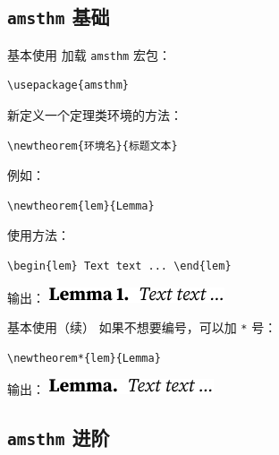 \documentclass[aspectratio=169,fontset=none]{ctexbeamer}
\newcommand{\pkg}[1]{\texttt{#1}}
\begin{document}
  \subsection{\texorpdfstring{\pkg{amsthm}}{amsthm} 基础}
  \begin{frame}[fragile]{基本使用}
    加载 \pkg{amsthm} 宏包：
    \begin{verbatim}
\usepackage{amsthm}
    \end{verbatim}
    新定义一个定理类环境的方法：
    \begin{verbatim}
\newtheorem{环境名}{标题文本}
    \end{verbatim}
    例如：
    \begin{verbatim}
\newtheorem{lem}{Lemma}
    \end{verbatim}
    使用方法：
    \begin{verbatim}
\begin{lem} Text text ... \end{lem}
    \end{verbatim}
    输出：
    \includegraphics{material/lem.pdf}
  \end{frame}
  \begin{frame}[fragile]{基本使用（续）}
    如果不想要编号，可以加 \texttt{*} 号：
    \begin{verbatim}
\newtheorem*{lem}{Lemma}
    \end{verbatim}
    输出：
    \includegraphics{material/lem2.pdf}
  \end{frame}
  \subsection{\texorpdfstring{\pkg{amsthm}}{amsthm} 进阶}
\end{document}
